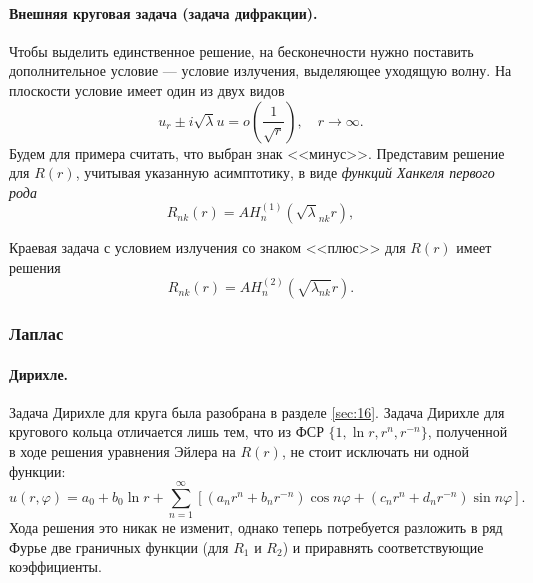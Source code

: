 \paragraph{Внешняя круговая задача (задача дифракции).}
Чтобы выделить единственное решение, на бесконечности нужно поставить
дополнительное условие --- условие излучения, выделяющее уходящую волну. На
плоскости условие имеет один из двух видов 
\[
u_r \pm i\sqrt\lambda u = o \left( \frac{1}{\sqrt r} \right), \quad
r\to\infty.
\]
Будем для примера считать, что выбран знак <<минус>>. Представим решение для $ R(r) $, учитывая указанную асимптотику, в виде
\emph{функций Ханкеля первого рода} 
\[
R_{nk}(r) = A H^{(1)}_n(\sqrt\lambda_{nk} r),
\]


Краевая задача с условием излучения со знаком <<плюс>> для $ R(r) $ имеет
решения  
\[
R_{nk}(r) = AH^{(2)}_n(\sqrt{\lambda_{nk}} r).
\]




\subsubsection{Лаплас}
\paragraph{Дирихле.} Задача Дирихле для круга была разобрана в разделе \ref{sec:16}. Задача Дирихле
для кругового кольца отличается лишь тем, что из ФСР $ \{1, \ln r, r^n, r^{-n}\}
$, полученной в ходе решения уравнения Эйлера на $ R(r) $, не стоит исключать ни
одной функции:
\[
u(r,\varphi) = a_0 + b_0\ln r + \sum_{n=1}^\infty [(a_nr^n + b_nr^{-n})\cos
n\varphi + (c_n r^n + d_n r^{-n})\sin n\varphi].
\]
Хода решения это никак не изменит, однако теперь потребуется
разложить в ряд Фурье две граничных функции (для $ R_1 $ и $ R_2 $) и приравнять
соответствующие коэффициенты.

